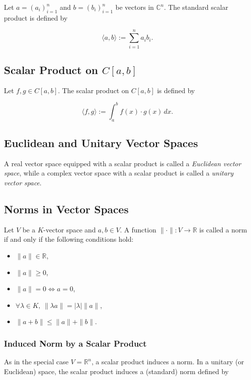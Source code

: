 Let \( a = {(a_i)}_{i=1}^n \) and \( b = {(b_i)}_{i=1}^n \) be vectors in \( \mathbb{C}^n \). The standard scalar product is defined by

\[
\langle a, b \rangle := \sum_{i=1}^n a_i b_i.
\]

\subsection{Scalar Product on \texorpdfstring{\( C[a, b] \)}{}}

Let \( f, g \in C[a, b] \). The scalar product on \( C[a, b] \) is defined by

\[
\langle f, g \rangle := \int_a^b f(x) \cdot g(x) \, dx.
\]

\subsection{Euclidean and Unitary Vector Spaces}

A real vector space equipped with a scalar product is called a \textit{Euclidean vector space}, while a complex vector space with a scalar product is called a \textit{unitary vector space}.

\subsection{Norms in Vector Spaces}

Let \( V \) be a \( K \)-vector space and \( a, b \in V \). A function \( \| \cdot \| : V \to \mathbb{R} \) is called a norm if and only if the following conditions hold:

\begin{itemize}[label=\(-\)]
    \item \( \|a\| \in \mathbb{R} \),
    \item \( \|a\| \geq 0 \),
    \item \( \|a\| = 0 \iff a = 0 \),
    \item \( \forall \lambda \in K, \ \| \lambda a \| = |\lambda| \| a \| \),
    \item \( \| a + b \| \leq \| a \| + \| b \| \).
\end{itemize}

\subsubsection{Induced Norm by a Scalar Product}

As in the special case \( V = \mathbb{R}^n \), a scalar product induces a norm.
In a unitary (or Euclidean) space, the scalar product induces a (standard) norm defined by

